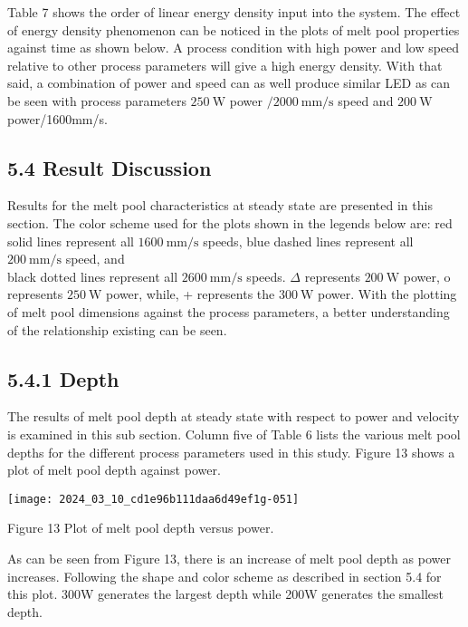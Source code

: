 \documentclass[10pt]{article}
\begin{document}
Table 7 shows the order of linear energy density input into the system. The effect of energy density phenomenon can be noticed in the plots of melt pool properties against time as shown below. A process condition with high power and low speed relative to other process parameters will give a high energy density. With that said, a combination of power and speed can as well produce similar LED as can be seen with process parameters $250 \mathrm{~W}$ power $/ 2000 \mathrm{~mm} / \mathrm{s}$ speed and $200 \mathrm{~W}$ power/1600mm/s.

\subsection*{5.4 Result Discussion}
Results for the melt pool characteristics at steady state are presented in this section. The color scheme used for the plots shown in the legends below are: red solid lines represent all $1600 \mathrm{~mm} / \mathrm{s}$ speeds, blue dashed lines represent all $200 \mathrm{~mm} / \mathrm{s}$ speed, and\\
black dotted lines represent all $2600 \mathrm{~mm} / \mathrm{s}$ speeds. $\Delta$ represents $200 \mathrm{~W}$ power, o represents $250 \mathrm{~W}$ power, while, + represents the $300 \mathrm{~W}$ power. With the plotting of melt pool dimensions against the process parameters, a better understanding of the relationship existing can be seen.

\subsection*{5.4.1 Depth}
The results of melt pool depth at steady state with respect to power and velocity is examined in this sub section. Column five of Table 6 lists the various melt pool depths for the different process parameters used in this study. Figure 13 shows a plot of melt pool depth against power.

\begin{center}
\texttt{[image: 2024\_03\_10\_cd1e96b111daa6d49ef1g-051]}
\end{center}

Figure 13 Plot of melt pool depth versus power.

As can be seen from Figure 13, there is an increase of melt pool depth as power increases. Following the shape and color scheme as described in section 5.4 for this plot. 300W generates the largest depth while 200W generates the smallest depth.
\end{document}

